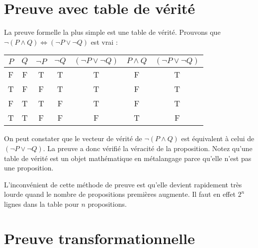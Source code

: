 		\section{Preuve avec table de vérité}
La preuve formelle la plus simple est une table de vérité.
		Prouvons que $\lnot (P \land Q) \Leftrightarrow (\lnot P \lor \lnot Q)$ est vrai :
			\begin{center}
			\begin{tabular}{cc|ccxcx}
			$P$ & $Q$ & $\lnot P$ & $\lnot Q$ & $(\lnot P \lor \lnot Q)$ & $P \land Q$ & $ (\lnot P \lor \lnot Q)$\\
			\hline
			F&F&T&T&T&F&T\\
			T&F&F&T&T&F&T\\
			F&T&T&F&T&F&T\\
			T&T&F&F&F&T&F\\
			\end{tabular}
			\end{center}

On peut constater que le vecteur de vérité de $\lnot (P \land Q)$ est équivalent à celui de $(\lnot P \lor  \lnot Q)$. La preuve a donc vérifié la véracité de la proposition.
Notez qu'une table de vérité est un objet mathématique en métalangage
parce qu'elle n'est pas une proposition.

L'inconvénient de cette méthode de preuve est qu'elle devient rapidement très lourde quand le nombre de propositions premières augmente. Il faut en effet $2^n$ lignes dans la table pour $n$ propositions. 

\section{Preuve transformationnelle} \label{transfo_propositionelle}

